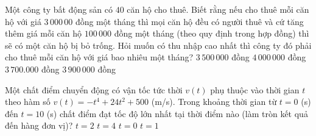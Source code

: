 \begin{ex}%
Một công ty bất động sản có $40$ căn hộ cho thuê. Biết rằng nếu cho thuê mỗi căn hộ với giá $3\,000\,00$ đồng một tháng thì mọi căn hộ đều có người thuê và cứ tăng thêm giá mỗi căn hộ $100\,000$ đồng một tháng (theo quy định trong hợp đồng) thì sẽ có một căn hộ bị bỏ trống. Hỏi muốn có thu nhập cao nhất thì công ty đó phải cho thuê mỗi căn hộ với giá bao nhiêu một tháng?
\choice
{\True $3\,500\,000$ đồng}
{$4\,000\,000$ đồng}
{$3\,700.000$ đồng}
{$3\,900\,000$ đồng}
\end{ex}

\begin{ex}%
Một chất điểm chuyển động có vận tốc tức thời $v(t)$ phụ thuộc vào thời gian $t$ theo hàm số $v(t)=-t^4+24t^2+500$ (m/s). Trong khoảng thời gian từ $t=0$ (s) đến $t=10$ (s) chất điểm đạt tốc độ lớn nhất tại thời điểm nào (làm tròn kết quả đến hàng đơn vị)?
\choice
{$t=2$}
{\True $t=4$}
{$t=0$}
{$t=1$}
\end{ex}

